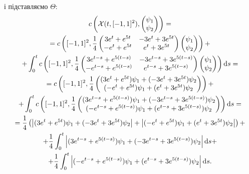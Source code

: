 \begin{solution}
	і підставляємо $\Theta$:
	\begin{multline*} 
		c\left(\mathcal{X}(t, [-1,1]^2), \begin{pmatrix} \psi_1 \\ \psi_2 \end{pmatrix}\right) = \\
		= c\left([-1,1]^2, \frac{1}{4} \begin{pmatrix} 3 e^t + e^{5 t} & -3 e^t + 3 e^{5 t} \\ - e^t + e^{5 t} & e^t + 3 e^{5 t}	\end{pmatrix} \begin{pmatrix} \psi_1 \\ \psi_2 \end{pmatrix} \right) + \\
		+ \int_0^t c\left([-1,1]^2, \frac{1}{4} \begin{pmatrix} 3 e^{t - s} + e^{5 (t - s)} & -3 e^{t - s} + 3 e^{5 (t - s)} \\ - e^{t - s} + e^{5 (t - s)} & e^{t - s} + 3 e^{5 (t - s)} \end{pmatrix} \begin{pmatrix} \psi_1 \\ \psi_2 \end{pmatrix} \right) \mathop{}\!\mathrm{d} s = \\
		= c\left([-1,1]^2, \frac{1}{4} \begin{pmatrix} (3 e^t + e^{5 t}) \psi_1 + (-3 e^t + 3 e^{5 t}) \psi_2 \\ (- e^t + e^{5 t}) \psi_1 + (e^t + 3 e^{5 t}) \psi_2 \end{pmatrix}  \right) + \\
		+ \int_0^t c\left([-1,1]^2, \frac{1}{4} \begin{pmatrix} (3 e^{t - s} + e^{5 (t - s)}) \psi_1 + (-3 e^{t - s} + 3 e^{5 (t - s)}) \psi_2 \\ (- e^{t - s} + e^{5 (t - s)}) \psi_1 + (e^{t - s} + 3 e^{5 (t - s)}) \psi_2 \end{pmatrix} \right) \mathop{}\!\mathrm{d} s = \\
		= \frac{1}{4} \left( \left|(3 e^t + e^{5 t}) \psi_1 + (-3 e^t + 3 e^{5 t}) \psi_2\right| + \left|(- e^t + e^{5 t}) \psi_1 + (e^t + 3 e^{5 t}) \psi_2\right| \right) + \\
		+ \frac{1}{4} \int_0^t \left|(3 e^{t - s} + e^{5 (t - s)}) \psi_1 + (-3 e^{t - s} + 3 e^{5 (t - s)}) \psi_2\right| \mathop{}\!\mathrm{d} s + \\
		+ \frac{1}{4} \int_0^t \left|(- e^{t - s} + e^{5 (t - s)}) \psi_1 + (e^{t - s} + 3 e^{5 (t - s)}) \psi_2\right| \mathop{}\!\mathrm{d} s.
	\end{multline*}
\end{solution}

